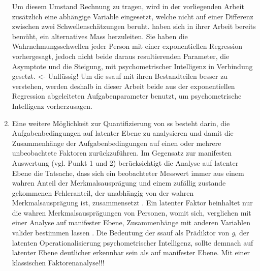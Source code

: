 \documentclass[11pt, twoside, a4paper]{book}		%
\begin{document}
\begin{enumerate}
	Um diesem Umstand Rechnung zu tragen, wird in der vorliegenden Arbeit zusätzlich eine abhängige Variable eingesetzt, welche nicht auf einer Differenz zwischen zwei Schwellenschätzungen beruht. \citeauthor{Melnick2013} haben sich in ihrer Arbeit bereits bemüht, ein alternatives Mass herzuleiten. Sie haben die Wahrnehmungsschwellen jeder Person mit einer exponentiellen Regression vorhergesagt, jedoch nicht beide daraus resultierenden Parameter, die Asymptote und die Steigung, mit psychometrischer Intelligenz in Verbindung gesetzt. <- Unflüssig! Um die \gls{ssauf} mit ihren Bestandteilen besser zu verstehen, werden deshalb in dieser Arbeit beide aus der exponentiellen Regression abgeleiteten Aufgabenparameter benutzt, um psychometrische Intelligenz vorherzusagen.

	\item Eine weitere Möglichkeit zur Quantifizierung von \gls{ss} besteht darin, die Aufgabenbedingungen auf latenter Ebene zu analysieren und damit die Zusammenhänge der Aufgabenbedingungen auf einen oder mehrere unbeobachtete Faktoren zurückzuführen. Im Gegensatz zur manifesten Auswertung (vgl. Punkt 1 und 2) berücksichtigt die Analyse auf latenter Ebene die Tatsache, dass sich ein beobachteter Messwert immer aus einem wahren Anteil der Merkmalsausprägung und einem zufällig zustande gekommenen Fehleranteil, der unabhängig von der wahren Merkmalsausprägung ist, zusammensetzt \citep{Moosbrugger2007}. Ein latenter Faktor beinhaltet nur die wahren Merkmalsausprägungen von Personen, womit sich, verglichen mit einer Analyse auf manifester Ebene, Zusammenhänge mit anderen Variablen valider bestimmen lassen \citep[S. 9]{Kline2011}. Die Bedeutung der \gls{ssauf} als Prädiktor von \textit{g}, der latenten Operationalisierung psychometrischer Intelligenz, sollte demnach auf latenter Ebene deutlicher erkennbar sein als auf manifester Ebene.
	Mit einer klassischen Faktorenanalyse!!!


\end{enumerate}
\end{document}
